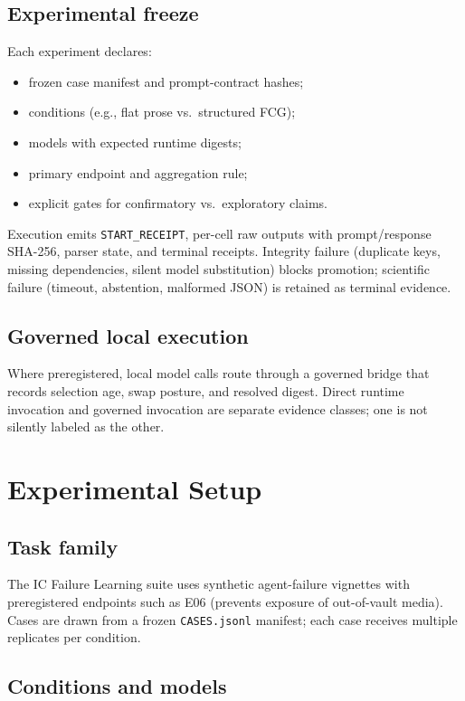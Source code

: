 \documentclass{article}
\begin{document}
\subsection{Experimental freeze}

Each experiment declares:
\begin{itemize}
  \item frozen case manifest and prompt-contract hashes;
  \item conditions (e.g., flat prose vs.\ structured FCG);
  \item models with expected runtime digests;
  \item primary endpoint and aggregation rule;
  \item explicit gates for confirmatory vs.\ exploratory claims.
\end{itemize}
Execution emits \texttt{START\_RECEIPT}, per-cell raw outputs with prompt/response SHA-256, parser state, and terminal receipts.
Integrity failure (duplicate keys, missing dependencies, silent model substitution) blocks promotion; scientific failure (timeout, abstention, malformed JSON) is retained as terminal evidence.

\subsection{Governed local execution}

Where preregistered, local model calls route through a governed bridge that records selection age, swap posture, and resolved digest.
Direct runtime invocation and governed invocation are separate evidence classes; one is not silently labeled as the other.

\section{Experimental Setup}

\subsection{Task family}

The IC Failure Learning suite uses synthetic agent-failure vignettes with preregistered endpoints such as E06 (prevents exposure of out-of-vault media).
Cases are drawn from a frozen \texttt{CASES.jsonl} manifest; each case receives multiple replicates per condition.

\subsection{Conditions and models}
\end{document}
